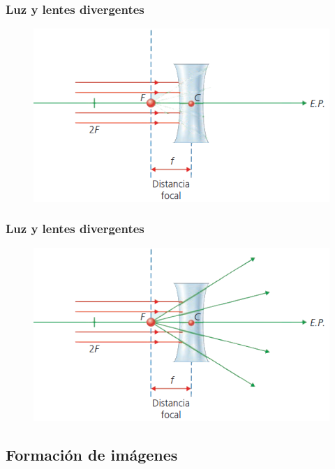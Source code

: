 \documentclass[14pt]{beamer}
\begin{document}
\begin{frame}
\frametitle{Luz y lentes divergentes}
\begin{figure}
    \centering
    \includegraphics[scale=0.7]{Imagenes/Lentes_divergentes_02_02.png}
\end{figure}
\end{frame}
\begin{frame}
\frametitle{Luz y lentes divergentes}
\begin{figure}
    \centering
    \includegraphics[scale=0.7]{Imagenes/Lentes_divergentes_02.png}
\end{figure}
\end{frame}

\subsection{Formación de imágenes}
\end{document}
